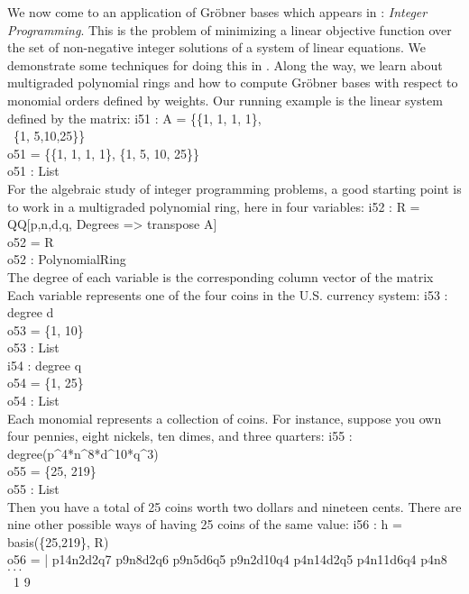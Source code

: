 We now come to an application of Gr\"obner bases which appears in
\cite[Section 8.1]{CLO2}: {\sl Integer Programming}. This is the problem of
 minimizing a linear objective function over the set of non-negative 
integer solutions of a system of linear equations.  We demonstrate
some techniques for doing this in \Mtwo. Along the way, we learn about
multigraded polynomial rings and how to compute
Gr\"obner bases with respect to monomial orders defined by weights.
Our running example is the linear system defined  by the matrix:
\beginOutput
i51 : A = \{\{1, 1, 1, 1\},\\
\           \{1, 5,10,25\}\}\\
\emptyLine
o51 = \{\{1, 1, 1, 1\}, \{1, 5, 10, 25\}\}\\
\emptyLine
o51 : List\\
\endOutput
For the algebraic study of integer programming problems, a good starting
point is to work in a multigraded polynomial ring, here in four variables:
\beginOutput
i52 : R = QQ[p,n,d,q, Degrees => transpose A]\\
\emptyLine
o52 = R\\
\emptyLine
o52 : PolynomialRing\\
\endOutput
The degree of each variable is the corresponding column vector of the matrix
Each variable represents one of the four coins in the U.S. currency system:
\beginOutput
i53 : degree d\\
\emptyLine
o53 = \{1, 10\}\\
\emptyLine
o53 : List\\
\endOutput
\beginOutput
i54 : degree q\\
\emptyLine
o54 = \{1, 25\}\\
\emptyLine
o54 : List\\
\endOutput
Each monomial represents a collection of coins. For instance, suppose
you own four  pennies, eight nickels, ten dimes, and three quarters:
\beginOutput
i55 : degree(p^4*n^8*d^10*q^3)\\
\emptyLine
o55 = \{25, 219\}\\
\emptyLine
o55 : List\\
\endOutput
Then you have a total of 25 coins worth two dollars and nineteen cents.
There are nine other possible ways of having 25 coins of the same value:
\beginOutput
i56 : h = basis(\{25,219\}, R)\\
\emptyLine
o56 = | p14n2d2q7 p9n8d2q6 p9n5d6q5 p9n2d10q4 p4n14d2q5 p4n11d6q4 p4n8 $\cdot\cdot\cdot$\\
\emptyLine
\              1       9\\
